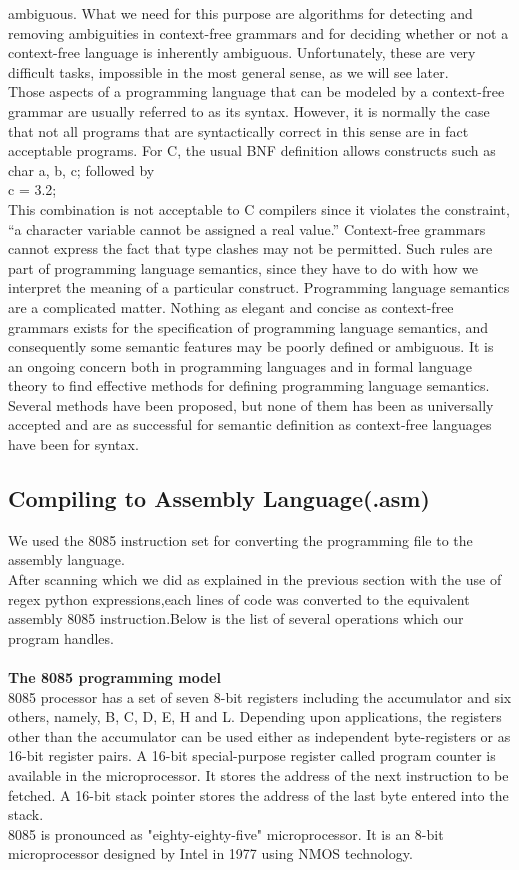 \documentclass[12pt]{article}
\begin{document}
ambiguous. What we need for this purpose are algorithms for detecting and removing ambiguities in
context-free grammars and for deciding whether or not a context-free language is inherently
ambiguous. Unfortunately, these are very difficult tasks, impossible in the most general sense, as we
will see later.\\Those aspects of a programming language that can be modeled by a context-free grammar are
usually referred to as its syntax. However, it is normally the case that not all programs that are
syntactically correct in this sense are in fact acceptable programs. For C, the usual BNF definition
allows constructs such as\\
char
a, b, c; followed by\\
c = 3.2;\\
This combination is not acceptable to C compilers since it violates the constraint, “a character
variable cannot be assigned a real value.” Context-free grammars cannot express the fact that type
clashes may not be permitted. Such rules are part of programming language semantics, since they have
to do with how we interpret the meaning of a particular construct.
Programming language semantics are a complicated matter. Nothing as elegant and concise as
context-free grammars exists for the specification of programming language semantics, and
consequently some semantic features may be poorly defined or ambiguous. It is an ongoing concern
both in programming languages and in formal language theory to find effective methods for defining
programming language semantics. Several methods have been proposed, but none of them has been as
universally accepted and are as successful for semantic definition as context-free languages have
been for syntax.

\subsection{Compiling to Assembly Language(.asm)}
We used the 8085 instruction set for converting the programming file to the assembly language.\\
After scanning which we did as explained in the previous section with the use of regex python expressions,each lines of code was converted to the equivalent assembly 8085 instruction.Below is the list of several operations which our program handles.\\\\
\textbf{The 8085 programming model}\\
8085 processor has a set of seven 8-bit registers including the accumulator and six others, namely, B, C, D, E, H and L. Depending upon applications, the registers other than the accumulator can be used either as independent byte-registers or as 16-bit register pairs.
A 16-bit special-purpose register called program counter is available in the microprocessor. It stores the address of the next instruction to be fetched. A 16-bit stack pointer stores the address of the last byte entered into the stack.\\
8085 is pronounced as "eighty-eighty-five" microprocessor. It is an 8-bit microprocessor designed by Intel in 1977 using NMOS technology.\\
\end{document}
